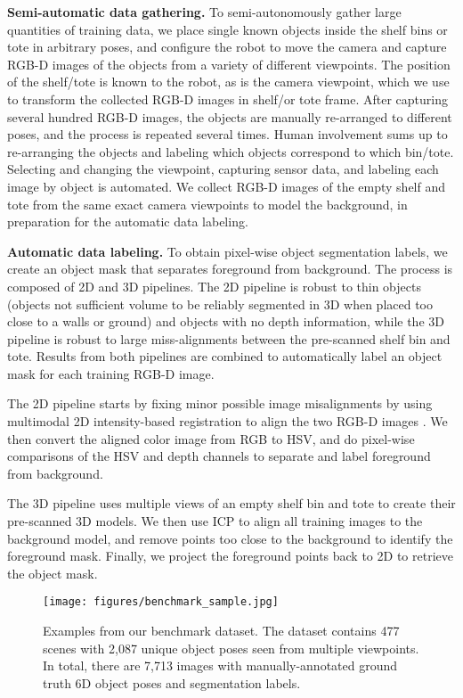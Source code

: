 \documentclass[letterpaper, 10 pt, conference]{ieeeconf}  %
\newcommand{\myparagraph}[1]{\vspace{0.1in}\noindent\textbf{#1}}
\begin{document}
\myparagraph{Semi-automatic data gathering.} To semi-autonomously gather large quantities of training data, we place single known objects inside the shelf bins or tote in arbitrary poses, and configure the robot to move the camera and capture RGB-D images of the objects from a variety of different viewpoints.
The position of the shelf/tote is known to the robot, as is the camera viewpoint, which we use to transform the collected RGB-D images in shelf/or tote frame.
After capturing several hundred RGB-D images, the objects are manually re-arranged to different poses, and the process is repeated several times. 
Human involvement sums up to re-arranging the objects and labeling which objects correspond to which bin/tote. 
Selecting and changing the viewpoint, capturing sensor data, and labeling each image by object is automated.
We collect RGB-D images of the empty shelf and tote from the same exact camera viewpoints to model the background, in preparation for the automatic data labeling. 


\myparagraph{Automatic data labeling.} To obtain pixel-wise object segmentation labels, we create an object mask that separates foreground from background. The process is composed of 2D and 3D pipelines. The 2D pipeline is robust to thin objects (objects not sufficient volume to be reliably segmented in 3D when placed too close to a walls or ground) and objects with no depth information, while the 3D pipeline is robust to large miss-alignments between the pre-scanned shelf bin and tote. Results from both pipelines are combined to automatically label an object mask for each training RGB-D image.

The 2D pipeline starts by fixing minor possible image misalignments by using multimodal 2D intensity-based registration to align the two RGB-D images \cite{styner2000parametric}. We then convert the aligned color image from RGB to HSV, and do pixel-wise comparisons of the HSV and depth channels to separate and label foreground from background.

The 3D pipeline uses multiple views of an empty shelf bin and tote to create their pre-scanned 3D models. We then use ICP to align all training images to the background model, and remove points too close to the background to identify the foreground mask. Finally, we project the foreground points back to 2D to retrieve the object mask.

\begin{figure}[t]
\vspace{2mm}
\centering
  \texttt{[image: figures/benchmark\_sample.jpg]}
  \caption{Examples from our benchmark dataset. The dataset contains 477 scenes with 2,087 unique object poses seen from multiple viewpoints. In total, there are 7,713 images with manually-annotated ground truth 6D object poses and segmentation labels.}
\label{fig:benchmark}
\vspace{-5mm}
\end{figure}
\end{document}
